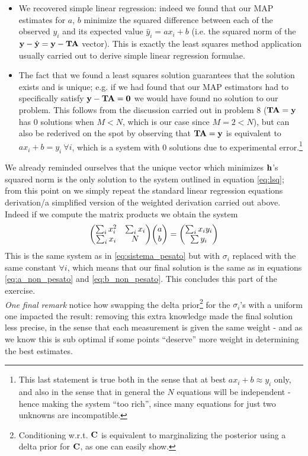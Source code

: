 \documentclass[a4paper]{article}
\newcommand{\mat}[1]{\vb{#1}}
\begin{document}
\begin{itemize}
    \item We recovered simple linear regression: indeed we found that our MAP estimates for $a$, $b$ minimize the squared difference between each of the observed $y_i$ and its expected value $\hat{y}_i = ax_i+b$ (i.e. the squared norm of the $\vb{y} - \hat{\vb{y}} = \vb{y}-\mat{T}\vb{A}$ vector). This is exactly the least squares method application usually carried out to derive simple linear regression formulae.
    \item The fact that we found a least squares solution guarantees that the solution exists and is unique; e.g. if we had found that our MAP estimators had to specifically satisfy $\vb{y}-\mat{T}\vb{A} = \vb{0}$ we would have found no solution to our problem. This follows from the discussion carried out in problem 8 ($\mat{T}\vb{A} = \vb{y}$ has 0 solutions when $M<N$, which is our case since $M=2<N$), but can also be rederived on the spot by observing that $\mat{T}\vb{A}=\vb{y}$ is equivalent to $ax_i+b=y_i \ \forall i$, which is a system with 0 solutions due to experimental error.\footnote{This last statement is true both in the sense that at best $ax_i+b\approx y_i$ only, and also in the sense that in general the $N$ equations will be independent - hence making the system ``too rich'', since many equations for just two unknowns are incompatible.}
\end{itemize}
We already reminded ourselves that the unique vector which minimizes $\vb{h}$'s squared norm is the only solution to the system outlined in equation \eqref{eq:lsq}; from this point on we simply repeat the standard linear regression equations derivation/a simplified version of the weighted derivation carried out above.\\
Indeed if we compute the matrix products we obtain the system
\begin{equation*}
    \mqty(\sum_i x_i^2 & \sum_i x_i \\ \sum_i x_i & N)\mqty(a \\ b) = \mqty(\sum_i x_iy_i \\ \sum y_i)
\end{equation*}
This is the same system as in \eqref{eq:sistema_pesato} but with $\sigma_i$ replaced with the same constant $\forall i$, which means that our final solution is the same as in equations \eqref{eq:a_non_pesato} and \eqref{eq:b_non_pesato}.
This concludes this part of the exercise.\\
\emph{One final remark} notice how swapping the delta prior\footnote{Conditioning w.r.t. $\mat{C}$ is equivalent to marginalizing the posterior using a delta prior for $\mat{C}$, as one can easily show.} for the $\sigma_i$'s with a uniform one impacted the result: removing this extra knowledge made the final solution less precise, in the sense that each measurement is given the same weight - and as we know this is sub optimal if some points ``deserve'' more weight in determining the best estimates.
\end{document}
